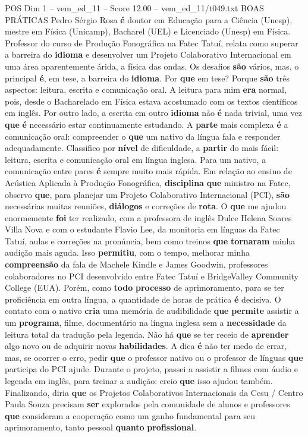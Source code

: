 \begin{textsample}{POS Dim 1 – vem\_ed\_11 – Score 12.00 – vem\_ed\_11/t049.txt}  \label{ex:f1_pos_148}
BOAS PRÁTICAS Pedro Sérgio Rosa \textbf{é} doutor em Educação para a Ciência (Unesp), mestre em Física (Unicamp), Bacharel (UEL) e Licenciado (Unesp) em Física.
Professor do curso de Produção Fonográfica na Fatec Tatuí, relata como superar a barreira do \textbf{idioma} e desenvolver um Projeto Colaborativo Internacional em uma área aparentemente árida, a física das ondas.
Os desafios \textbf{são} vários, mas, o principal \textbf{é}, em tese, a barreira do \textbf{idioma}.
Por \textbf{que} em tese?
Porque \textbf{são} três aspectos: leitura, escrita e comunicação oral.
A leitura para mim \textbf{era} normal, pois, desde o Bacharelado em Física estava acostumado com os textos científicos em inglês.
Por outro lado, a escrita em outro \textbf{idioma} não \textbf{é} nada trivial, uma vez \textbf{que} \textbf{é} necessário estar continuamente estudando.
A \textbf{parte} mais complexa \textbf{é} a comunicação oral: compreender o \textbf{que} um nativo da língua fala e responder adequadamente.
Classifico por \textbf{nível} de dificuldade, a \textbf{partir} do mais fácil: leitura, escrita e comunicação oral em língua inglesa.
Para um nativo, a comunicação entre pares \textbf{é} sempre muito mais rápida.
Em relação ao ensino de Acústica Aplicada à Produção Fonográfica, \textbf{disciplina} \textbf{que} ministro na Fatec, observo \textbf{que}, para planejar um Projeto Colaborativo Internacional (PCI), \textbf{são} necessárias muitas reuniões, \textbf{diálogos} e correções de \textbf{rota}.
O \textbf{que} me ajudou enormemente \textbf{foi} ter realizado, com a professora de inglês Dulce Helena Soares Villa Nova e com o estudante Flavio Lee, da monitoria em línguas da Fatec Tatuí, aulas e correções na pronúncia, bem como treinos \textbf{que} \textbf{tornaram} minha audição mais aguda.
Isso \textbf{permitiu}, com o tempo, melhorar minha \textbf{compreensão} da fala de Machele Kindle e James Goodwin, professores colaboradores no PCI desenvolvido entre Fatec Tatuí e BridgeValley Community College (EUA).
Porém, como \textbf{todo} \textbf{processo} de aprimoramento, para se ter proficiência em outra língua, a quantidade de horas de prática \textbf{é} decisiva.
O contato com o nativo \textbf{cria} uma memória de audibilidade \textbf{que} \textbf{permite} assistir a um \textbf{programa}, filme, documentário na língua inglesa sem a \textbf{necessidade} da leitura total da tradução pela legenda.
Não há \textbf{que} se ter receio de \textbf{aprender} algo novo ou de adquirir novas \textbf{habilidades}.
A dica \textbf{é} não ter medo de errar, mas, se ocorrer o erro, pedir \textbf{que} o professor nativo ou o professor de línguas \textbf{que} participa do PCI ajude.
Durante o projeto, passei a assistir a filmes com áudio e legenda em inglês, para treinar a audição: creio \textbf{que} isso ajudou também.
Finalizando, diria \textbf{que} os Projetos Colaborativos Internacionais da Cesu / Centro Paula Souza precisam \textbf{ser} explorados pela comunidade de alunos e professores \textbf{que} consideram a cooperação como um ganho fundamental para seu aprimoramento, tanto pessoal \textbf{quanto} \textbf{profissional}.


\end{textsample}
